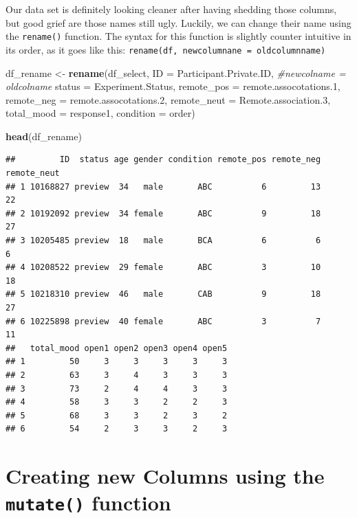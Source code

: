 \documentclass[
]{book}
\newenvironment{Shaded}{\begin{snugshade}}{\end{snugshade}}
\newcommand{\AttributeTok}[1]{\textcolor[rgb]{0.13,0.29,0.53}{#1}}
\newcommand{\CommentTok}[1]{\textcolor[rgb]{0.56,0.35,0.01}{\textit{#1}}}
\newcommand{\FloatTok}[1]{\textcolor[rgb]{0.00,0.00,0.81}{#1}}
\newcommand{\FunctionTok}[1]{\textcolor[rgb]{0.13,0.29,0.53}{\textbf{#1}}}
\newcommand{\NormalTok}[1]{#1}
\newcommand{\OtherTok}[1]{\textcolor[rgb]{0.56,0.35,0.01}{#1}}
\begin{document}
Our data set is definitely looking cleaner after having shedding those columns, but good grief are those names still ugly. Luckily, we can change their name using the \texttt{rename()} function. The syntax for this function is slightly counter intuitive in its order, as it goes like this: \texttt{rename(df,\ newcolumnane\ =\ oldcolumnname)}

\begin{Shaded}
\begin{Highlighting}[]
\NormalTok{df\_rename }\OtherTok{\textless{}{-}} \FunctionTok{rename}\NormalTok{(df\_select, }
                    \AttributeTok{ID =}\NormalTok{ Participant.Private.ID, }\CommentTok{\#newcolname = oldcolname}
                    \AttributeTok{status =}\NormalTok{ Experiment.Status,}
                    \AttributeTok{remote\_pos =}\NormalTok{ remote.assocotations}\FloatTok{.1}\NormalTok{,}
                    \AttributeTok{remote\_neg =}\NormalTok{ remote.assocotations}\FloatTok{.2}\NormalTok{,}
                    \AttributeTok{remote\_neut =}\NormalTok{ Remote.association}\FloatTok{.3}\NormalTok{,}
                    \AttributeTok{total\_mood =}\NormalTok{ response1,}
                    \AttributeTok{condition =}\NormalTok{ order)}

\FunctionTok{head}\NormalTok{(df\_rename)}
\end{Highlighting}
\end{Shaded}

\begin{verbatim}
##         ID  status age gender condition remote_pos remote_neg remote_neut
## 1 10168827 preview  34   male       ABC          6         13          22
## 2 10192092 preview  34 female       ABC          9         18          27
## 3 10205485 preview  18   male       BCA          6          6           6
## 4 10208522 preview  29 female       ABC          3         10          18
## 5 10218310 preview  46   male       CAB          9         18          27
## 6 10225898 preview  40 female       ABC          3          7          11
##   total_mood open1 open2 open3 open4 open5
## 1         50     3     3     3     3     3
## 2         63     3     4     3     3     3
## 3         73     2     4     4     3     3
## 4         58     3     3     2     2     3
## 5         68     3     3     2     3     2
## 6         54     2     3     3     2     3
\end{verbatim}

\section{\texorpdfstring{Creating new Columns using the \texttt{mutate()} function}{Creating new Columns using the mutate() function}}\label{creating-new-columns-using-the-mutate-function}
\end{document}

